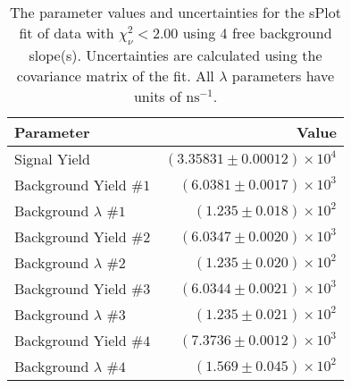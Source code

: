
\begin{table}
    \begin{center}
        \begin{tabular}{lr}\toprule
            Parameter & Value \\\midrule
            Signal Yield & $(3.35831 \pm 0.00012) \times 10^{4}$ \\
            Background Yield $\#1$ & $(6.0381 \pm 0.0017) \times 10^{3}$ \\
            Background $\lambda$ $\#1$ & $(1.235 \pm 0.018) \times 10^{2}$ \\
            Background Yield $\#2$ & $(6.0347 \pm 0.0020) \times 10^{3}$ \\
            Background $\lambda$ $\#2$ & $(1.235 \pm 0.020) \times 10^{2}$ \\
            Background Yield $\#3$ & $(6.0344 \pm 0.0021) \times 10^{3}$ \\
            Background $\lambda$ $\#3$ & $(1.235 \pm 0.021) \times 10^{2}$ \\
            Background Yield $\#4$ & $(7.3736 \pm 0.0012) \times 10^{3}$ \\
            Background $\lambda$ $\#4$ & $(1.569 \pm 0.045) \times 10^{2}$ \\\bottomrule
        \end{tabular}
        \caption{The parameter values and uncertainties for the sPlot fit of data with $\chi^2_\nu < 2.00$ using 4 free background slope(s). Uncertainties are calculated using the covariance matrix of the fit. All $\lambda$ parameters have units of $\si{\nano\second}^{-1}$.}
    \end{center}
\end{table}
